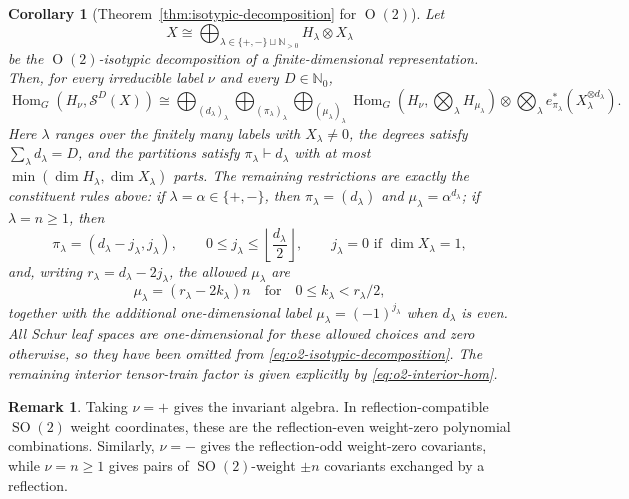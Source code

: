 \documentclass[11pt]{article}
\newcommand{\dsN}{\mathbb{N}}
\newcommand{\scS}{\mathcal{S}}
\newcommand{\HomG}[2]{\operatorname{Hom}_G\!\left(#1,#2\right)}
\newcommand{\SO}{\operatorname{SO}}
\newcommand{\Orth}{\operatorname{O}}
\newtheorem{corollary}[theorem]{Corollary}
\theoremstyle{definition}
\newtheorem{remark}[theorem]{Remark}
\begin{document}
\begin{corollary}[Theorem~\ref{thm:isotypic-decomposition} for $\Orth(2)$]\label{cor:o2-isotypic-decomposition}
  Let
  \[
    X\cong \bigoplus_{\lambda\in\{+,-\}\sqcup\dsN_{>0}}H_\lambda\otimes X_\lambda
  \]
  be the $\Orth(2)$-isotypic decomposition of a finite-dimensional representation.
  Then, for every irreducible label $\nu$ and every $D\in\dsN_0$,
  \begin{equation}\label{eq:o2-isotypic-decomposition}
    \HomG{H_\nu}{\scS^D(X)}
    \cong
    \bigoplus_{(d_\lambda)_\lambda}
    \bigoplus_{(\pi_\lambda)_\lambda}
    \bigoplus_{(\mu_\lambda)_\lambda}
    \HomG{H_\nu}{\bigotimes_\lambda H_{\mu_\lambda}}
    \otimes
    \bigotimes_\lambda e_{\pi_\lambda}^*(X_\lambda^{\otimes d_\lambda}).
  \end{equation}
  Here $\lambda$ ranges over the finitely many labels with $X_\lambda\neq0$, the degrees satisfy $\sum_\lambda d_\lambda=D$, and the partitions satisfy $\pi_\lambda\vdash d_\lambda$ with at most $\min(\dim H_\lambda, \dim X_\lambda)$ parts.
  The remaining restrictions are exactly the constituent rules above: if $\lambda=\alpha\in\{+,-\}$, then $\pi_\lambda=(d_\lambda)$ and $\mu_\lambda=\alpha^{d_\lambda}$; if $\lambda=n\ge 1$, then
  \[
    \pi_\lambda=(d_\lambda-j_\lambda,j_\lambda),
    \qquad
    0\le j_\lambda\le \left\lfloor\frac{d_\lambda}{2}\right\rfloor,
    \qquad
    j_\lambda=0\text{ if }\dim X_\lambda=1,
  \]
  and, writing $r_\lambda=d_\lambda-2j_\lambda$, the allowed $\mu_\lambda$ are
  \[
    \mu_\lambda=(r_\lambda-2k_\lambda)n
    \quad\text{for}\quad
    0\le k_\lambda<r_\lambda/2,
  \]
  together with the additional one-dimensional label $\mu_\lambda=(-1)^{j_\lambda}$ when $d_\lambda$ is even.
  All Schur leaf spaces are one-dimensional for these allowed choices and zero otherwise, so they have been omitted from \eqref{eq:o2-isotypic-decomposition}.
  The remaining interior tensor-train factor is given explicitly by \eqref{eq:o2-interior-hom}.
\end{corollary}

\begin{remark}
  Taking $\nu=+$ gives the invariant algebra.
  In reflection-compatible $\SO(2)$ weight coordinates, these are the reflection-even weight-zero polynomial combinations.
  Similarly, $\nu=-$ gives the reflection-odd weight-zero covariants, while $\nu=n\ge 1$ gives pairs of $\SO(2)$-weight $\pm n$ covariants exchanged by a reflection.
\end{remark}
\end{document}

